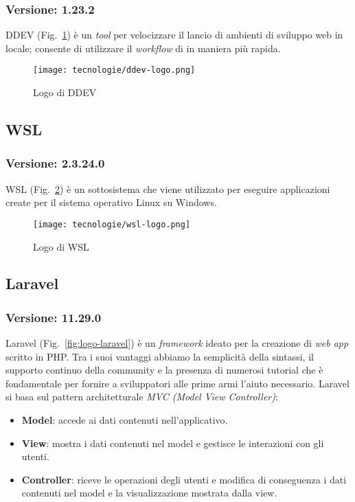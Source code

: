 \subsubsection{Versione: 1.23.2}
DDEV (Fig.~\ref{fig:logo-ddev}) è un \emph{tool} per velocizzare il lancio di ambienti di sviluppo web in locale; consente di utilizzare il \emph{\gls{workflow}} di  in maniera più rapida.

\begin{figure}[!h] 
  \centering 
  \texttt{[image: tecnologie/ddev-logo.png]} 
  \caption{Logo di DDEV}
  \label{fig:logo-ddev}
\end{figure}



\subsection{\label{tec:wsl}WSL}
\subsubsection{Versione: 2.3.24.0}
WSL (Fig.~\ref{fig:logo-wsl}) è un sottosistema che viene utilizzato per eseguire applicazioni create per il sistema operativo Linux su Windows.

\begin{figure}[!h] 
  \centering 
  \texttt{[image: tecnologie/wsl-logo.png]} 
  \caption{Logo di WSL}
  \label{fig:logo-wsl}
\end{figure}

\subsection{\label{tec:Laravel}Laravel}
\subsubsection{Versione: 11.29.0}
Laravel (Fig.~\ref{fig:logo-laravel}) è un \emph{\gls{framework}} ideato per la creazione di \emph{\gls{web app}} scritto in PHP.
Tra i suoi vantaggi abbiamo la semplicità della sintassi, il supporto continuo della community e la presenza di numerosi tutorial che è fondamentale per fornire a sviluppatori alle prime armi l'aiuto necessario.
Laravel si basa sul pattern architetturale \emph{MVC (Model View Controller)}:
\begin{itemize}
  \item \textbf{Model}: accede ai dati contenuti nell'applicativo.
  \item \textbf{View}: mostra i dati contenuti nel model e gestisce le interazioni con gli utenti.  
  \item \textbf{Controller}: riceve le operazioni degli utenti e modifica di conseguenza i dati contenuti nel model e la visualizzazione mostrata dalla view.
\end{itemize}

